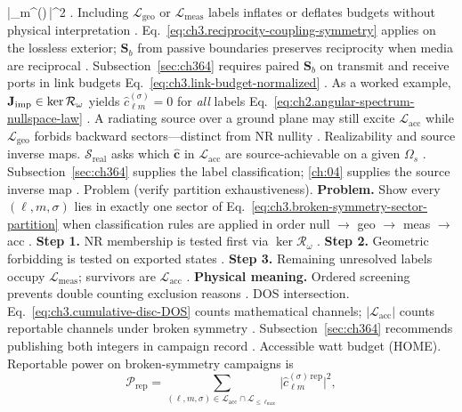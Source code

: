 |_{\ell m}^{(\sigma)\,}|^{2}\) \cite{poynting1884}. Including
\(\mathcal{L}_{\mathrm{geo}}\) or \(\mathcal{L}_{\mathrm{meas}}\) labels inflates or deflates budgets without physical
interpretation \cite{stratton1941}.
Eq.~\eqref{eq:ch3.reciprocity-coupling-symmetry} applies on the lossless exterior; \(\mathbf{S}_{b}\) from passive
boundaries preserves reciprocity when media are reciprocal \cite{stratton1941}. Subsection~\ref{sec:ch364}
requires paired \(\mathbf{S}_{b}\) on transmit and receive ports in link budgets Eq.~\eqref{eq:ch3.link-budget-normalized}
\cite{harrington2001}.
As a worked example, \(\mathbf{J}_{\mathrm{imp}}\in\ker\mathcal{R}_\omega\) yields \(\widehat{c}_{\ell m}^{(\sigma)}=0\) for \emph{all} labels
Eq.~\eqref{eq:ch2.angular-spectrum-nullspace-law} \cite{harrington2001}. A radiating source over a ground
plane may still excite \(\mathcal{L}_{\mathrm{acc}}\) while \(\mathcal{L}_{\mathrm{geo}}\) forbids backward sectors---distinct
from NR nullity \cite{harrington2001}.
Realizability and source inverse maps. $\mathcal{S}_{\mathrm{real}}$ asks which \(\widehat{\mathbf{c}}\) in \(\mathcal{L}_{\mathrm{acc}}\) are source-achievable on a given
\(\Omega_{s}\) \cite{harrington2001}. Subsection~\ref{sec:ch364} supplies the label classification;
\ref{ch:04} supplies the source inverse map \cite{harrington2001}.
Problem (verify partition exhaustiveness). \textbf{Problem.} Show every \((\ell,m,\sigma)\) lies in exactly one sector of
Eq.~\eqref{eq:ch3.broken-symmetry-sector-partition} when classification rules are applied in order null \(\to\) geo
\(\to\) meas \(\to\) acc \cite{harrington2001}.
\textbf{Step 1.} NR membership is tested first via \(\ker\mathcal{R}_\omega\) \cite{harrington2001}.
\textbf{Step 2.} Geometric forbidding is tested on exported states \cite{stratton1941}.
\textbf{Step 3.} Remaining unresolved labels occupy \(\mathcal{L}_{\mathrm{meas}}\); survivors are
\(\mathcal{L}_{\mathrm{acc}}\) \cite{devaney2004}.
\textbf{Physical meaning.} Ordered screening prevents double counting exclusion reasons \cite{harrington2001}.
DOS intersection. Eq.~\eqref{eq:ch3.cumulative-disc-DOS} counts mathematical channels; \(|\mathcal{L}_{\mathrm{acc}}|\) counts
reportable channels under broken symmetry \cite{harrington2001}. Subsection~\ref{sec:ch364} recommends
publishing both integers in campaign record \cite{harrington2001}.
Accessible watt budget (HOME). Reportable power on broken-symmetry campaigns is
\begin{equation}
\label{eq:ch3.accessible-watt-budget}
\mathcal{P}_{\mathrm{rep}}
=
\sum_{(\ell,m,\sigma)\in\mathcal{L}_{\mathrm{acc}}\cap\mathcal{L}_{\le\ell_{\max}}}
\big|\widehat{c}_{\ell m}^{(\sigma)\,\mathrm{rep}}\big|^{2},
\end{equation}
